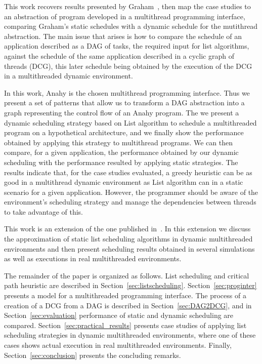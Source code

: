 \documentclass[twocolumn]{svjour3}
\begin{document}
This work recovers results presented by Graham~\cite{Graham76}, then map the case studies to an abstraction of program developed in a multithread programming interface, comparing Graham's static schedules with a dynamic schedule for the mutithread abstraction. The main issue that arises is how to compare the schedule of an application described as a DAG of tasks, the required input for list algorithms, against the schedule of the same application described in a cyclic graph of threads (DCG), this later schedule being obtained by the execution of the DCG in a multithreaded dynamic environment.

In this work, Anahy is the chosen multithread programming interface. Thus we present a set of patterns that allow us to transform a DAG abstraction into a graph representing the control flow of an Anahy program. The we present a dynamic scheduling strategy based on List algorithm to schedule a multithreaded program on a hypothetical architecture, and we finally show the performance obtained by applying this strategy to multithread programs. We can then compare, for a given application, the performance obtained by our dynamic scheduling with the performance resulted by applying static strategies. The results indicate that, for the case studies evaluated, a greedy heuristic can be as good in a multithread dynamic environment as List algorithm can in a static scenario for a given application. However, the programmer should be aware of the environment's scheduling strategy and manage the dependencies between threads to take advantage of this.

This work is an extension of the one published in~\cite{CiceroHPCLatam2012}. In this extension we discuss the approximation of static list scheduling algorithms in dynamic multithreaded environments and then present scheduling results obtained in several simulations as well as executions in real multithreaded environments.

The remainder of the paper is organized as follows. List scheduling and critical path heuristic are described in Section~\ref{sec:listscheduling}. Section~\ref{sec:proginter} presents a model for a multithreaded programming interface. The process of a creation of a DCG from a DAG is described in Section~\ref{sec:DAG2DCG}, and in Section~\ref{sec:evaluation} performance of static and dynamic scheduling are compared. Section~\ref{sec:practical_results} presents case studies of applying list scheduling strategies in dynamic multithreaded environments, where one of these cases shows actual execution in real multithreaded environments. Finally,  Section~\ref{sec:conclusion} presents the concluding remarks.
\end{document}
